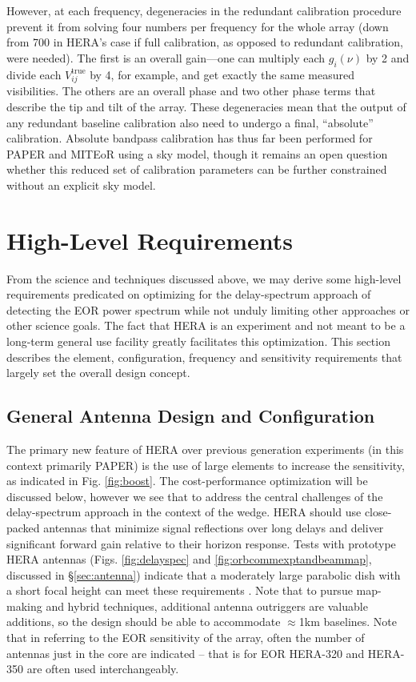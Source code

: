 \documentclass[preprint,11pt]{aastex}
\begin{document}
However, at each frequency, degeneracies in the redundant calibration procedure prevent it from solving four numbers per frequency for the whole array (down from 700 in HERA's case if full calibration, as opposed to redundant calibration, were needed). The first is an overall gain---one can multiply each $g_i(\nu)$ by 2 and divide each $V_{ij}^\text{true}$ by 4, for example, and get exactly the same measured visibilities. The others are an overall phase and two other phase terms that describe the tip and tilt of the array. These degeneracies mean that the output of any redundant baseline calibration also need to undergo a final, ``absolute'' calibration. Absolute bandpass calibration has thus far been performed for PAPER and MITEoR using a sky model, though it remains an open question whether this reduced set of calibration parameters can be further constrained without an explicit sky model.


\section{High-Level Requirements} 
\label{sec:requirements}
From the science and techniques discussed above, we may derive some high-level requirements predicated on optimizing for the delay-spectrum approach of detecting the EOR power spectrum while not unduly limiting other approaches or other science goals.  The fact that HERA is an experiment and not meant to be a long-term general use facility greatly facilitates this optimization. This section describes the element, configuration, frequency and sensitivity requirements that largely set the overall design concept.

\subsection{General Antenna Design and Configuration}
The primary new feature of HERA over previous generation experiments (in this context primarily PAPER) is the use of large elements to increase the sensitivity, as indicated in Fig. \ref{fig:boost}.  The cost-performance optimization will 
be discussed below, however we see that to address the central challenges of the delay-spectrum approach in the context of the wedge.
HERA should use close-packed antennas that
minimize signal reflections over long delays and deliver significant forward gain relative to their horizon response.
Tests with prototype HERA antennas (Figs.  \ref{fig:delayspec} and \ref{fig:orbcommexptandbeammap}, discussed in \S\ref{sec:antenna})
indicate that a moderately large parabolic dish with a short focal height can meet these requirements
\citep{ewall-wice_et_al2016-EoXLimits,neben_et_al2016,thyagarajan_et_al2016}.  Note that to pursue map-making and hybrid techniques, additional antenna outriggers are valuable additions, so the design
should be able to accommodate $\approx$1km baselines.  Note that in referring to the EOR sensitivity of the array, often the number of antennas just in the core are
indicated -- that is for EOR HERA-320 and HERA-350 are often used interchangeably.
\end{document}

